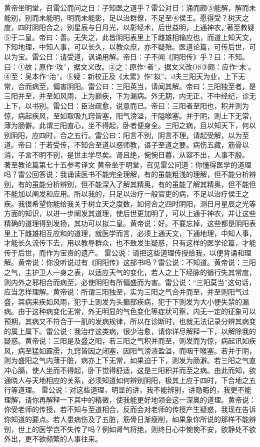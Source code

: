 \documentclass[a4paper,12pt,UTF8,twoside]{ctexbook}
\begin{document}
黄帝坐明堂，召雷公而问之日：子知医之道乎？雷公对日：涌而颇③能解，解而未能别，别而未能明，明而未能彰，足以治群僚，不足至④侯王。愿得受？树天之度，四时阴阳合之，别星辰与日月光，以彰经术，后世益明，上通神农，’著至教疑⑤于二皇。帝曰：善。无失之，此皆阴阳表里上下雌雄相输应也，而道上知天文，下知地理，中知人事，可以长久，以教众庶，亦不疑殆。医道论篇，可传后世，可以为宝。雷公日：请受道，讽诵用解。帝日：子不闻《阴阳传》乎？曰：不知。曰：①故；原作“攻”，据文义改。②之：原作“者”，据文义改OS③颇：应作“末’。④至：吴本作“治”。⑤疑：新校正及《太累》作”拟”、d夫三阳天为业，上下无常，合而病至，偏害阴阳。雷公曰：三阳英当，请闻其解。帝曰：三阳独至者，是三阳并至，并至如风雨，上为巅疾，下为漏病。外无期，内无正，不中经纪，诊无上下，以书别。雷公日：臣治疏愈，说意而已。帝曰：三阳者至阳也，积并则为惊，病起疾风，至如取吸九窍皆塞，阳气滂溢，干隘喉塞。并于阴，则上下无常，薄为肠僻。此谓三阳直心，坐不得起，卧者便身全。三阳之病，且以知天下，何以别阴阳，应四时，合之五行。雷公曰：阳言不别，阴言不理，请起受解，以为至道。帝曰：于若受传，不知合至道以惑师教，语子至道之要。病伤五藏，筋骨以消，子言不明不别，是世主学尽矣。肾且绝，惋惋日暮，从容不出，人事不殷。
著至教论篇第七十五参考译文
黄帝坐于明堂，召见雷公问道：你懂得医学的道理吗？雷公回答说：我诵读医书不能完全理解，有的虽能粗浅的理解，但不能分析辨别，有的虽能分析辨别，但不能深入了解其精奥，有的虽能了解其精奥，但不能但不能加以阐发和应用。所以我的，只足以治疗一般官吏的病，不足以治疗侯王之疾。我很希望你能给我关于树立天之度数，如何合之四时阴阳，测日月星辰之光等方面的知识，以进一步阐发其道理，使后世更加明了，可以上通于神农，并让这些精确的道理得到发扬，其功可以拟二皇。黄帝说：好。不要忘掉，这些都是阴阳表里上下雌雄相互应和的道理，就医学而言，必须上通天文，下通地理，中知人事，才能长久流传下去，用以教导群众，也不致发生疑惑，只有这样的医学论篇，才能传于后世，而作为宝贵的遗产。
雷公说：请把这些道理传授给我，以便背诵和理解。黄帝说：你没听说过有《阴阳传》这部书吗？雷公说：不知道。黄帝说：三阳之气，主护卫人一身之表，以适应天气的变化，若人之上下经脉的循行失其常度，则内外之邪相合而病至，必使阴阳有所偏盛而为害。雷公说：“三阳莫当”这句话，应当怎样理解。黄帝说：所谓三阳独至，实为三阳之气合并而至，并至则阳气过盛，其病来疾如风雨，犯于上则发为头癫部疾病，犯于下则发为大小便失禁的漏病。由于这种病变化无常，外无明显的气色变化等症状可察，内无一定的征象可以预期，其病又不符合于一肌的发病规律，所以在诊断时，也就无法记录分辨其病变的属上属下。雷公说：我治疗这类病，很少治愈，请你详尽解释一下，以解除我的疑惑。黄帝说：三阳是及盛之阳，若三阳之气积并而至，则发而为惊，病起讯如疾风，病至猛如霹雳，九窍皆因之闭塞，因阳气滂渍盈溢，而咽干喉塞。若并于阴，则为盛阳之气内薄于脏，病亦上下无常，如果迫于下，则发为肠澼。若三阳之气直冲心膈，使人坐而不得起，卧下觉得舒适，这是三阳积并而至之病。由此而知，欲通晓人与天地相应的关系，必须知道如何辨别阴阳，极其上应于四时，下合地之五行等道理。
雷公说：对这些道理，明显的讲，我不能辨别，讲隐晦的，我更不能理解，请你再解释一下其中的精微，使我能更好地领会这一深奥的道理。黄帝说：你受老师的传授，若不知与至道相合，反而会对老师的传授产生疑惑，我现在告诉你知道的要点。若人患病伤及了五脏，筋骨日渐瘦削，如果象你所说的那样不能辨别，世上的医学岂不失传了吗？例如肾气将绝，则终日心中惋惋不安，欲静处不欲外出，更不欲频繁的人事往来。
\end{document}

